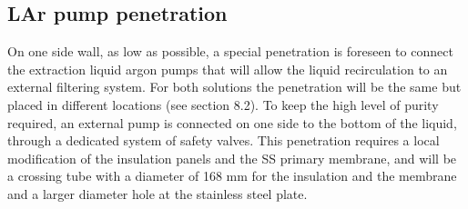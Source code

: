 \subsection{LAr pump penetration}

On one side wall, as low as possible, a special penetration is foreseen to connect the extraction liquid argon pumps that will allow the liquid recirculation to an external filtering system. For both solutions the penetration will be the same but placed in different locations (see section 8.2).
To keep the high level of purity required, an external pump is connected on one side to the bottom of the liquid, through a dedicated system of safety valves. This penetration requires a local modification of the insulation panels and the SS primary membrane, and will be a crossing tube with a diameter of 168 mm for the insulation and the membrane and a larger diameter hole at the stainless steel plate.

